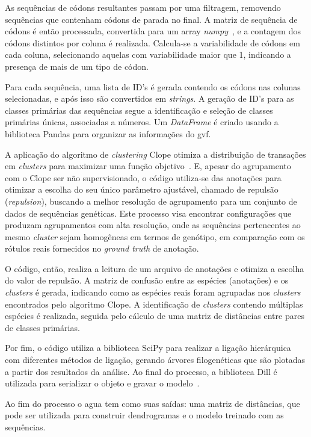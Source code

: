 As sequências de códons resultantes passam por uma filtragem, removendo sequências que contenham códons de parada no final. A matriz de sequência de códons é então processada, convertida para um array \textit{numpy}~\cite{numpy_van_2011}, e a contagem dos códons distintos por coluna é realizada. Calcula-se a variabilidade de códons em cada coluna, selecionando aquelas com variabilidade maior que 1, indicando a presença de mais de um tipo de códon.

Para cada sequência, uma lista de ID's é gerada contendo os códons nas colunas selecionadas, e após isso são convertidos em \textit{strings}. A geração de ID's para as classes primárias das sequências segue a identificação e seleção de classes primárias únicas, associadas a números. Um \textit{DataFrame} é criado usando a biblioteca Pandas para organizar as informações do \gls{gvf}.

A aplicação do algoritmo de \textit{clustering} Clope otimiza a distribuição de transações em \textit{clusters} para maximizar uma função objetivo~\cite{Clope_yang_2002}. E, apesar do agrupamento com o Clope ser não supervisionado, o código utiliza-se das anotações para otimizar a escolha do seu único parâmetro ajustável, chamado de repulsão (\textit{repulsion}), buscando a melhor resolução de agrupamento para um conjunto de dados de sequências genéticas. Este processo visa encontrar configurações que produzam agrupamentos com alta resolução, onde as sequências pertencentes ao mesmo \textit{cluster} sejam homogêneas em termos de genótipo, em comparação com os rótulos reais fornecidos no \textit{ground truth} de anotação.

O código, então, realiza a leitura de um arquivo de anotações e otimiza a escolha do valor de repulsão. A matriz de confusão entre as espécies (anotações) e os \textit{clusters} é gerada, indicando como as espécies reais foram agrupadas nos \textit{clusters} encontrados pelo algoritmo Clope. A identificação de \textit{clusters} contendo múltiplas espécies é realizada, seguida pelo cálculo de uma matriz de distâncias entre pares de classes primárias.

Por fim, o código utiliza a biblioteca SciPy para realizar a ligação hierárquica com diferentes métodos de ligação, gerando árvores filogenéticas que são plotadas a partir dos resultados da análise. Ao final do processo, a biblioteca Dill é utilizada para serializar o objeto e gravar o modelo~\cite{dill}.

Ao fim do processo o \gls{agua} tem como suas saídas: uma matriz de distâncias, que pode ser utilizada para construir dendrogramas e o modelo treinado com as sequências.

